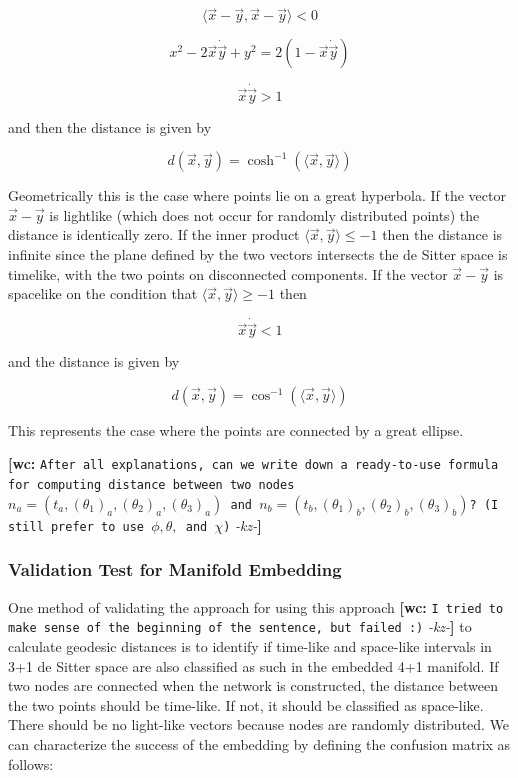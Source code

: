 \documentclass[preprint,notitlepage,amsmath,amssymb,floatfix]{revtex4-1}
\newcommand{\XXX}[3]{{\bf [#1: } {\tt #3} {\it -#2-}{\bf ]}}
\begin{document}
\begin{equation}
\langle\vec x - \vec y,\vec x - \vec y\rangle < 0
\end{equation}

\begin{equation}
x^2 - 2\vec x\dot\vec y + y^2 = 2\left(1-\vec x\dot\vec y\right)
\end{equation}

\begin{equation}
\vec x\dot\vec y > 1
\end{equation}

\noindent and then the distance is given by

\begin{equation}
d(\vec{x},\vec{y}) = \cosh^{-1}(\langle \vec{x}, \vec{y}\rangle)
\end{equation}

\noindent Geometrically this is the case where points lie on a great hyperbola.  
If the vector $\vec{x}-\vec{y}$ is lightlike (which does not occur for randomly distributed points) the distance is identically zero.  
If the inner product $\langle \vec{x},\vec{y}\rangle \leq -1$ then the distance is infinite since the plane defined by the two vectors intersects the de Sitter space is timelike, with the two points on disconnected components.  
If the vector $\vec{x}-\vec{y}$ is spacelike on the condition that $\langle \vec{x},\vec{y}\rangle \geq -1$ then

\begin{equation}
\vec x\dot\vec y < 1
\end{equation}

\noindent and the distance is given by

\begin{equation}
d(\vec{x},\vec{y}) = \cos^{-1}(\langle \vec{x},\vec{y}\rangle)
\end{equation}

\noindent This represents the case where the points are connected by a great ellipse.

\XXX{wc}{kz}{After all explanations, can we write down a ready-to-use formula for computing distance between two nodes $n_a=(t_a,(\theta_1)_a,(\theta_2)_a,(\theta_3)_a)$  and $n_b=(t_b,(\theta_1)_b,(\theta_2)_b,(\theta_3)_b)$? (I still prefer to use $\phi, \theta,$ and $\chi$)}

\subsubsection{Validation Test for Manifold Embedding}
One method of validating the approach for using this approach \XXX{wc}{kz}{I tried to make sense of the beginning of the sentence, but failed :)} to calculate geodesic distances is to identify if time-like and space-like intervals in 3+1 de Sitter space are also classified as such in the embedded 4+1 manifold.  
If two nodes are connected when the network is constructed, the distance between the two points should be time-like.  
If not, it should be classified as space-like.  
There should be no light-like vectors because nodes are randomly distributed.
We can characterize the success of the embedding by defining the confusion matrix as follows:
\end{document}
